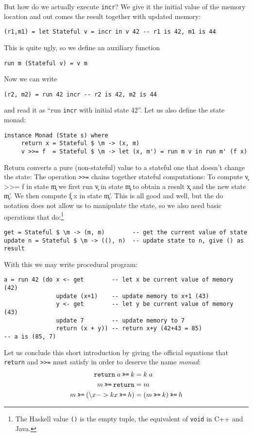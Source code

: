 \documentclass[a4paper,10pt]{article}
\newcommand{\cc}[1]{\lstinline{#1}}
\newcommand{\bind}{\mathbin{\text{\texttt{\char62\char62\char61}}}}
\begin{document}
But how do we actually execute \cc{incr}? We give it the initial value of the
memory location and out comes the result together with updated memory:
% 
\begin{lstlisting}
(r1,m1) = let Stateful v = incr in v 42 -- r1 is 42, m1 is 44
\end{lstlisting}
% 
This is quite ugly, so we define an auxiliary function
% 
\begin{lstlisting}
run m (Stateful v) = v m
\end{lstlisting}
% 
Now we can write
% 
\begin{lstlisting}
(r2, m2) = run 42 incr -- r2 is 42, m2 is 44
\end{lstlisting}
% 
and read it as ``run \cc{incr} with initial state 42''. Let us also define the state monad:
% 
\begin{lstlisting}
instance Monad (State s) where
     return x = Stateful $ \m -> (x, m)
     v >>= f  = Stateful $ \m -> let (x, m') = run m v in run m' (f x)
\end{lstlisting}
Return converts a pure (non-stateful) value to a stateful one that doesn't change the state:
The operation \cc{>>=} chains together stateful computations:
% 
To compute \c{v >>= f} in state \c{m} we first run \c{v} in state \c{m} to
obtain a result \c{x} and the new state \c{m'}. We then compute \c{f x} in
state \c{m'}. This is all good and well, but the do notation does not allow us
to manipulate the state, so we also need basic operations that
do:\footnote{The Haskell value \cc{()} is the empty tuple, the equivalent of
  \cc{void} in C++ and Java.}
% 
\begin{lstlisting}
get = Stateful $ \m -> (m, m)        -- get the current value of state
update n = Stateful $ \m -> ((), n)  -- update state to n, give () as result
\end{lstlisting}
% 
With this we may write procedural program:
% 
\begin{lstlisting}
a = run 42 (do x <- get        -- let x be current value of memory (42)
               update (x+1)    -- update memory to x+1 (43)
               y <- get        -- let y be current value of memory (43)
               update 7        -- update memory to 7
               return (x + y)) -- return x+y (42+43 = 85)
-- a is (85, 7)  
\end{lstlisting}
% 
Let us conclude this short introduction by giving the official equations that
\cc{return} and \cc{>>=} must satisfy in order to deserve the name
\emph{monad}:
% 
\begin{align*}
  \mathtt{return}\; a \bind k &= k\; a \\
  m \bind \mathtt{return}              &=   m \\
  m \bind (\backslash x -> k x \bind h)   &=   (m \bind k) \bind h
\end{align*}
\end{document}
